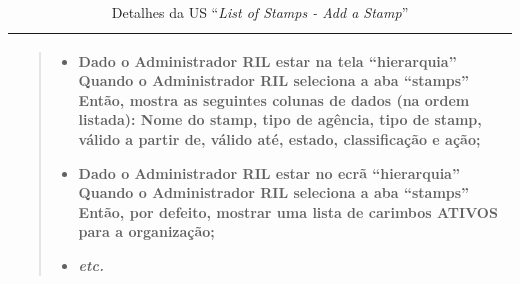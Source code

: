 \begin{table}[H]
\begin{tabularx}{1\textwidth}{|>{\raggedright\arraybackslash}X|}
\begin{quote}
\begin{itemize}
                                \item Dado o Administrador RIL estar na tela ``hierarquia'' \newline
                                Quando o Administrador RIL seleciona a aba ``stamps'' \newline
                                Então, mostra as seguintes colunas de dados (na ordem listada): Nome do stamp, tipo de agência, tipo de stamp, válido a partir de, válido até, estado, classificação e ação;

                                \item Dado o Administrador RIL estar no ecrã ``hierarquia'' \newline
                                Quando o Administrador RIL seleciona a aba ``stamps'' \newline
                                Então, por defeito, mostrar uma lista de carimbos ATIVOS para a organização;
                            
                                \item \textit{etc.}
                            \end{itemize}
                            
                        \end{quote}
                        \\
                        \hline
                    \end{tabularx}
                    \caption{Detalhes da US ``\textit{List of Stamps - Add a Stamp}''}\label{table:us1}
                \end{table}

